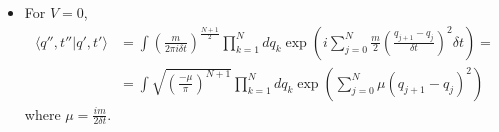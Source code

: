 \documentclass[twoside]{amsart}
\begin{document}
\begin{itemize}
\[
\begin{gathered}
  * = \left( \frac{1}{2\pi} \right) \left( \frac{ \pi}{ \frac{ i \delta t}{2m } } \right)^{1/2} \exp{ \left( \frac{ - (q_{j+1} - q_j)^2}{ \frac{ 4 i \delta t}{2m} } \right) } = \left( \frac{ m }{ 2\pi i \delta t} \right)^{1/2} \exp{ \left( \frac{ - m (q_{j+1} - q_j)^2 \delta t }{ 2i (\delta t)^2 } \right) }
\end{gathered}
\]
\[
\begin{gathered}
  \Longrightarrow \langle q'', t''|q',t' \rangle = \int \prod^N_{k=1} dq_k \left( \frac{ m}{2\pi i \delta t} \right)^{\frac{N+1}{2} } \prod^N_{j=0} \exp{ \left( \frac{ i m}{2} \left( \frac{ q_{j+1} - q_j}{ \delta t } \right)^2 \delta t - i \delta t V(\overline{q}_j) \right) } = \\
  \begin{aligned} & = \int \prod_{k=1}^N dq_k \left( \frac{ m}{ 2 \pi i \delta t} \right)^{ \frac{N+1}{2} } \exp{ \left( i \lbrace \sum_{j=0}^N \left( \frac{m}{2} \dot{q}_j^2 \right) - V(\overline{q}_j) \rbrace \delta t \right) } = \\ 
    & = \int \left( \frac{ m }{2\pi i \delta t } \right)^{\frac{N+1}{2} } \prod_{k=1}^N dq_k \exp{ \left[ i \int_{t'}^{t''} dt L(\dot{q}(t), q(t)) \right] }
\end{aligned}
\end{gathered}
\]
So $\boxed{ \mathcal{D}q = \lim_{N\to \infty} \left( \frac{m}{2\pi i \delta t} \right)^{\frac{N+1}{2}} \prod_{k=1}^N dq_k }$; $\delta t = \frac{T}{N+1}$.  
\item[(b)] For $V=0$,
\[
\begin{aligned}
\langle q'',t''|q',t' \rangle & = \int \left( \frac{ m }{2\pi i \delta t} \right)^{\frac{N+1}{2} } \prod^N_{k=1} dq_k \exp{ \left( i \sum_{j=0}^N \frac{m}{2} \left( \frac{ q_{j+1} - q_j }{ \delta t} \right)^2 \delta t \right) } = \\
& = \int \sqrt{ \left( \frac{ - \mu }{\pi} \right)^{N+1} } \prod_{k=1}^N dq_k \exp{ \left( \sum_{j=0}^N \mu (q_{j+1} - q_j)^2 \right) }
\end{aligned}
\]
where $\mu = \frac{ i m}{ 2 \delta t}$.  


\end{itemize}
\end{document}
